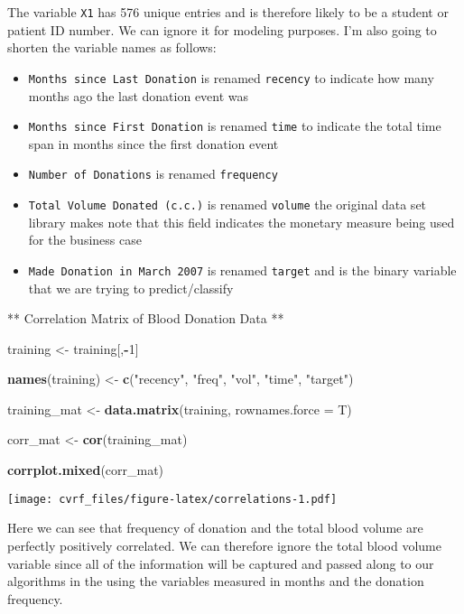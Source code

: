 \documentclass[]{article}
\newenvironment{Shaded}{\begin{snugshade}}{\end{snugshade}}
\newcommand{\KeywordTok}[1]{\textcolor[rgb]{0.13,0.29,0.53}{\textbf{#1}}}
\newcommand{\DataTypeTok}[1]{\textcolor[rgb]{0.13,0.29,0.53}{#1}}
\newcommand{\DecValTok}[1]{\textcolor[rgb]{0.00,0.00,0.81}{#1}}
\newcommand{\StringTok}[1]{\textcolor[rgb]{0.31,0.60,0.02}{#1}}
\newcommand{\OperatorTok}[1]{\textcolor[rgb]{0.81,0.36,0.00}{\textbf{#1}}}
\newcommand{\NormalTok}[1]{#1}
\providecommand{\tightlist}{%
  \setlength{\itemsep}{0pt}\setlength{\parskip}{0pt}}
\begin{document}
The variable \texttt{X1} has 576 unique entries and is therefore likely
to be a student or patient ID number. We can ignore it for modeling
purposes. I'm also going to shorten the variable names as follows:

\begin{itemize}
\tightlist
\item
  \texttt{Months\ since\ Last\ Donation} is renamed \texttt{recency} to
  indicate how many months ago the last donation event was
\item
  \texttt{Months\ since\ First\ Donation} is renamed \texttt{time} to
  indicate the total time span in months since the first donation event
\item
  \texttt{Number\ of\ Donations} is renamed \texttt{frequency}
\item
  \texttt{Total\ Volume\ Donated\ (c.c.)} is renamed \texttt{volume} the
  original data set library makes note that this field indicates the
  monetary measure being used for the business case
\item
  \texttt{Made\ Donation\ in\ March\ 2007} is renamed \texttt{target}
  and is the binary variable that we are trying to predict/classify
\end{itemize}

** Correlation Matrix of Blood Donation Data **

\begin{Shaded}
\begin{Highlighting}[]
\NormalTok{training <-}\StringTok{ }\NormalTok{training[,}\OperatorTok{-}\DecValTok{1}\NormalTok{]}

\KeywordTok{names}\NormalTok{(training) <-}\StringTok{ }\KeywordTok{c}\NormalTok{(}\StringTok{"recency"}\NormalTok{, }\StringTok{"freq"}\NormalTok{, }\StringTok{"vol"}\NormalTok{, }\StringTok{"time"}\NormalTok{, }\StringTok{"target"}\NormalTok{)}

\NormalTok{training_mat <-}\StringTok{ }\KeywordTok{data.matrix}\NormalTok{(training, }\DataTypeTok{rownames.force =}\NormalTok{ T)}

\NormalTok{corr_mat <-}\StringTok{ }\KeywordTok{cor}\NormalTok{(training_mat)}

\KeywordTok{corrplot.mixed}\NormalTok{(corr_mat)}
\end{Highlighting}
\end{Shaded}

\texttt{[image: cvrf\_files/figure-latex/correlations-1.pdf]}

Here we can see that frequency of donation and the total blood volume
are perfectly positively correlated. We can therefore ignore the total
blood volume variable since all of the information will be captured and
passed along to our algorithms in the using the variables measured in
months and the donation frequency.
\end{document}

